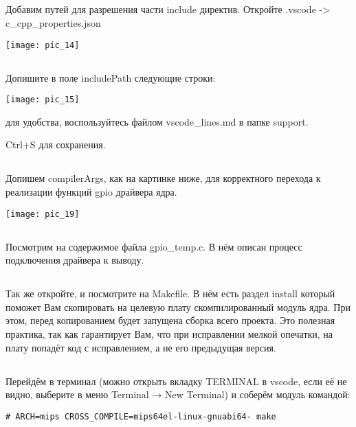 \subsection{}Добавим путей для разрешения части include директив. Откройте .vscode -> c\_cpp\_properties.json
\begin{center}
	\texttt{[image: pic\_14]}
\end{center}

\subsection{}Допишите в поле includePath следующие строки:\\
\begin{center}
	\texttt{[image: pic\_15]}
\end{center}
для удобства, воспользуйтесь файлом vscode\_lines.md в папке support.

Ctrl+S для сохранения.

\subsection{}Допишем compilerArgs, как на картинке ниже, для корректного перехода к реализации функций gpio драйвера ядра.\\
\begin{center}
	\texttt{[image: pic\_19]}
\end{center}

\subsection{}Посмотрим на содержимое файла gpio\_temp.c. В нём описан процесс подключения драйвера к выводу.

\subsection{}Так же откройте, и посмотрите на Makefile. В нём есть раздел install который поможет Вам скопировать на целевую плату скомпилированный модуль ядра. При этом, перед копированием будет запущена сборка всего проекта. Это полезная практика, так как гарантирует Вам, что при исправлении мелкой опечатки, на плату попадёт код с исправлением, а не его предыдущая версия.

\subsection{}Перейдём в терминал (можно открыть вкладку TERMINAL в vscode, если её не видно, выберите в меню Terminal → New Terminal) и соберём модуль командой:
\begin{lstlisting}[style=bash]
# ARCH=mips CROSS_COMPILE=mips64el-linux-gnuabi64- make 
\end{lstlisting}

